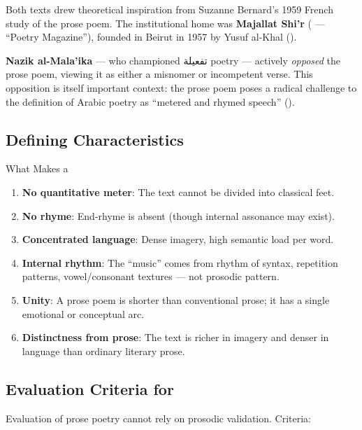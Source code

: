 Both texts drew theoretical inspiration from Suzanne Bernard's 1959 French study of the prose poem. The institutional home was \textbf{Majallat Shi'r} ( — ``Poetry Magazine''), founded in Beirut in 1957 by Yusuf al-Khal ().

\textbf{Nazik al-Mala'ika} — who championed تفعيلة poetry — actively \textit{opposed} the prose poem, viewing it as either a misnomer or incompetent verse. This opposition is itself important context: the prose poem poses a radical challenge to the definition of Arabic poetry as ``metered and rhymed speech'' ().

\subsection{Defining Characteristics}

\begin{rulebox}{What Makes a }
\begin{enumerate}
  \item \textbf{No quantitative meter}: The text cannot be divided into classical feet.
  \item \textbf{No rhyme}: End-rhyme is absent (though internal assonance may exist).
  \item \textbf{Concentrated language}: Dense imagery, high semantic load per word.
  \item \textbf{Internal rhythm}: The ``music'' comes from rhythm of syntax, repetition patterns, vowel/consonant textures — not prosodic pattern.
  \item \textbf{Unity}: A prose poem is shorter than conventional prose; it has a single emotional or conceptual arc.
  \item \textbf{Distinctness from prose}: The text is richer in imagery and denser in language than ordinary literary prose.
\end{enumerate}
\end{rulebox}

\subsection{Evaluation Criteria for }

Evaluation of prose poetry cannot rely on prosodic validation. Criteria:

